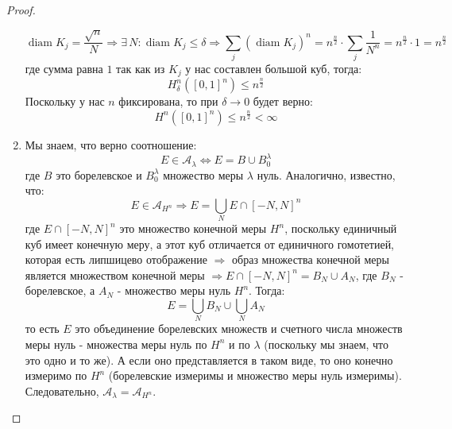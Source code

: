 \documentclass[12pt]{article}
\newcommand{\MA}{\mathcal{A}}
\theoremstyle{definition}
\DeclareMathOperator{\diam}{\text{diam}}
\newcommand{\ddsum}[2]{\displaystyle\sum\limits_{#1}^{#2}}
\begin{document}
\begin{proof}
\begin{enumerate}[label=\arabic*)]
		$$
			\diam{K_j} = \dfrac{\sqrt{n}}{N} \Rightarrow \exists\, N \colon \diam{K_j} \leq \delta \Rightarrow \ddsum{j}{}(\diam{K_j})^n = n^{\tfrac{n}{2}}{\cdot}\ddsum{j}{}\dfrac{1}{N^n} = n^{\tfrac{n}{2}}{\cdot}1 = n^{\tfrac{n}{2}}
		$$
		где сумма равна $1$ так как из $K_j$ у нас составлен большой куб, тогда: 
		$$
			H_\delta^n([0,1]^n) \leq n^{\tfrac{n}{2}}
		$$ 
		Поскольку у нас $n$ фиксирована, то при $\delta \to 0$ будет верно:
		$$
			H^n([0,1]^n) \leq n^{\tfrac{n}{2}} < \infty
		$$
		\item Мы знаем, что верно соотношение: 
		$$
			E \in \MA_\lambda \Leftrightarrow E = B \cup B_0^\lambda
		$$ 
		где $B$ это борелевское и $B_0^\lambda$ множество меры $\lambda$ нуль. Аналогично, известно, что: 
		$$
			E \in \MA_{H^n} \Rightarrow E = \bigcup\limits_N E \cap [-N,N]^n
		$$ 
		где $E \cap [-N,N]^n$ это множество конечной меры $H^n$, поскольку единичный куб имеет конечную меру, а этот куб отличается от единичного гомотетией, которая есть липшицево отображение $\Rightarrow$ образ множества конечной меры является множеством конечной меры $\Rightarrow E \cap [-N,N]^n = B_N \cup A_N$, где $B_N$ - борелевское, а $A_N$ - множество меры нуль $H^n$. Тогда: 
		$$
			E = \bigcup\limits_N B_N \cup \bigcup\limits_N A_N
		$$ 
		то есть $E$ это объединение борелевских множеств и счетного числа множеств меры нуль - множества меры нуль по $H^n$ и по $\lambda$ (поскольку мы знаем, что это одно и то же). А если оно представляется в таком виде, то оно конечно измеримо по $H^n$ (борелевские измеримы и множество меры нуль измеримы). Следовательно, $\MA_\lambda = \MA_{H^n}$.
		

\end{enumerate}
\end{proof}
\end{document}
